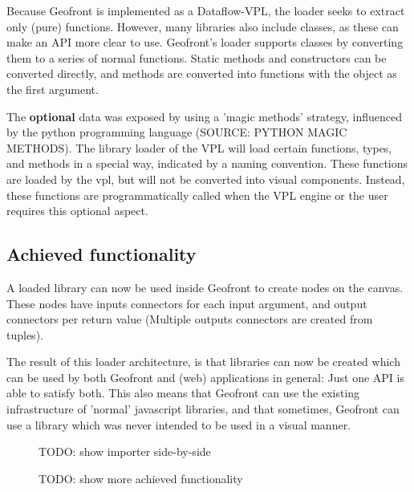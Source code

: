 Because Geofront is implemented as a Dataflow-VPL, the loader seeks to extract only (pure) functions. 
However, many libraries also include classes, as these can make an API more clear to use. 
Geofront's loader supports classes by converting them to a series of normal functions. 
Static methods and constructors can be converted directly, and methods are converted into functions with the object as the first argument.

The \textbf{optional} data was exposed by using a 'magic methods' strategy, influenced by the python programming language (SOURCE: PYTHON MAGIC METHODS). 
The library loader of the VPL will load certain functions, types, and methods in a special way, indicated by a naming convention. 
These functions are loaded by the vpl, but will not be converted into visual components. 
Instead, these functions are programmatically called when the VPL engine or the user requires this optional aspect. 

\subsection{Achieved functionality}

A loaded library can now be used inside Geofront to create nodes on the canvas. 
These nodes have inputs connectors for each input argument, and output connectors per return value (Multiple outputs connectors are created from tuples). 

The result of this loader architecture, is that libraries can now be created which can be used by both Geofront and (web) applications in general:
Just one API is able to satisfy both.
This also means that Geofront can use the existing infrastructure of 'normal' javascript libraries, and that sometimes, Geofront can use a library which was never intended to be used in a visual manner. 

\begin{figure}
  \centering
  \graphicspath{ {../../assets/diagrams/} }
  \caption[]{TODO: show importer side-by-side}
  \label{fig:todo-1}
\end{figure}


\begin{figure}
  \centering
  \graphicspath{ {../../assets/diagrams/} }
  \caption[]{TODO: show more achieved functionality}
  \label{fig:todo-2}
\end{figure}

